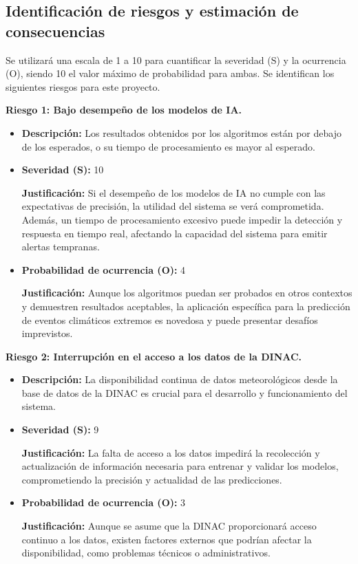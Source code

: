 \documentclass[
11pt, %
codirector, %
]{charter}
\begin{document}
\subsection{Identificación de riesgos y estimación de consecuencias}

Se utilizará una escala de 1 a 10 para cuantificar la severidad (S) y la ocurrencia (O), siendo 10 el valor máximo de probabilidad para ambas. Se identifican los siguientes riesgos para este proyecto.

\textbf{Riesgo 1: Bajo desempeño de los modelos de IA.}
\begin{itemize}
  \item \textbf{Descripción:} Los resultados obtenidos por los algoritmos están por debajo de los esperados, o su tiempo de procesamiento es mayor al esperado.
  \item \textbf{Severidad (S):} 10
  
  \textbf{Justificación:} Si el desempeño de los modelos de IA no cumple con las expectativas de precisión, la utilidad del sistema se verá comprometida. Además, un tiempo de procesamiento excesivo puede impedir la detección y respuesta en tiempo real, afectando la capacidad del sistema para emitir alertas tempranas.
  \item \textbf{Probabilidad de ocurrencia (O):} 4
  
  \textbf{Justificación:} Aunque los algoritmos puedan ser probados en otros contextos y demuestren resultados aceptables, la aplicación específica para la predicción de eventos climáticos extremos es novedosa y puede presentar desafíos imprevistos.
\end{itemize}

\textbf{Riesgo 2: Interrupción en el acceso a los datos de la DINAC.}

\begin{itemize}
  \item \textbf{Descripción:} La disponibilidad continua de datos meteorológicos desde la base de datos de la DINAC es crucial para el desarrollo y funcionamiento del sistema.
  \item \textbf{Severidad (S):} 9
  
  \textbf{Justificación:} La falta de acceso a los datos impedirá la recolección y actualización de información necesaria para entrenar y validar los modelos, comprometiendo la precisión y actualidad de las predicciones.
  \item \textbf{Probabilidad de ocurrencia (O):} 3
  
  \textbf{Justificación:} Aunque se asume que la DINAC proporcionará acceso continuo a los datos, existen factores externos que podrían afectar la disponibilidad, como problemas técnicos o administrativos.
\end{itemize}
\end{document}
